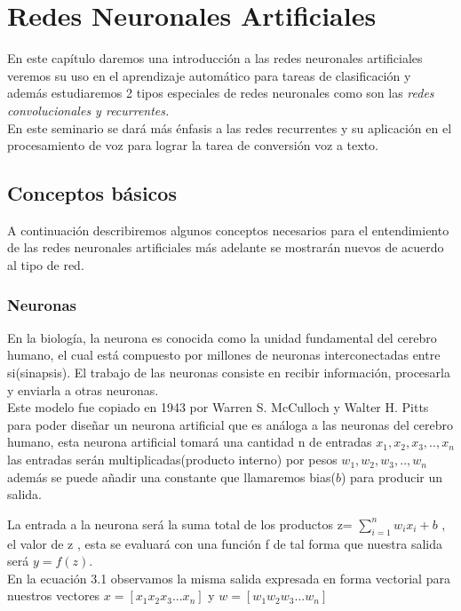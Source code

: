 \chapter{Redes Neuronales Artificiales}

En este capítulo daremos una introducción a las redes neuronales artificiales veremos su uso en el aprendizaje automático para tareas de clasificación y además estudiaremos 2 tipos especiales de redes neuronales como son las \textit{redes convolucionales y recurrentes.}\\
En este seminario se dará más énfasis a las redes recurrentes y su aplicación en el procesamiento de voz para lograr la tarea de conversión voz a texto.



\section{Conceptos básicos}
A continuación describiremos algunos conceptos necesarios para el entendimiento de las redes neuronales artificiales más adelante se mostrarán nuevos de acuerdo al tipo de red.
\subsection{Neuronas}
En la biología, la neurona es conocida como la unidad fundamental del cerebro humano, el cual está compuesto por millones de neuronas interconectadas entre si(sinapsis). El trabajo de las neuronas consiste en recibir información, procesarla y enviarla a otras neuronas.\\ Este modelo fue copiado en 1943 por Warren S. McCulloch y Walter H. Pitts para poder diseñar un neurona artificial que es análoga a las neuronas del cerebro humano, esta neurona artificial tomará una cantidad n de entradas $x_{1}, x_{2}, x_{3}, .. , x_{n}$ las entradas serán multiplicadas(producto interno) por pesos $w_{1}, w_{2}, w_{3}, .. , w_{n}$ además se puede añadir una constante que llamaremos bias($b$) para producir un salida.

La entrada a la neurona será la suma total de los productos z=  $\sum_{i=1}^{n}{ w_{i}x_{i}}+b$ , el valor de z , esta se evaluará con una función f de tal forma que nuestra salida será $y=f(z)$.\\ En la ecuación 3.1 observamos la misma salida expresada en forma vectorial para nuestros vectores  $x = [x_{1}  x_{2}  x_{3}  ...  x_{n}]$ y $w = [w_{1}  w_{2}  w_{3}  ...  w_{n}]$



